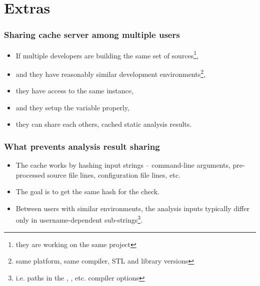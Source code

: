 \documentclass[compress,table,xcolor=table]{beamer}
\begin{document}
\section{Extras}
\begin{frame}
  \Huge
\end{frame}
\begin{frame}
  \frametitle{Sharing cache server among multiple users}
  \Large
  \begin{itemize}
  \item If multiple developers are building the same set of sources\footnote{
      they are working on the same project},
  \item and they have reasonably similar development environments\footnote{
      same platform, same compiler, STL and library versions},
  \item they have access to the same  instance,
  \item and they setup the  variable properly,
  \item they can share each others, cached static analysis results.
  \end{itemize}
\end{frame}
\begin{frame}
  \frametitle{What prevents analysis result sharing}
  \Large
  \begin{itemize}
  \item The cache works by hashing input strings -- command-line arguments,
      pre-processed source file lines, configuration file lines, etc.
  \item The goal is to get the {\larger same hash} for the {\larger {} check}.
  \item Between users with similar environments, the analysis inputs typically
      differ only in {\larger username-dependent} sub-strings\footnote{
      i.e. paths in the , , etc. compiler options}.
  \end{itemize}
\end{frame}
\end{document}
